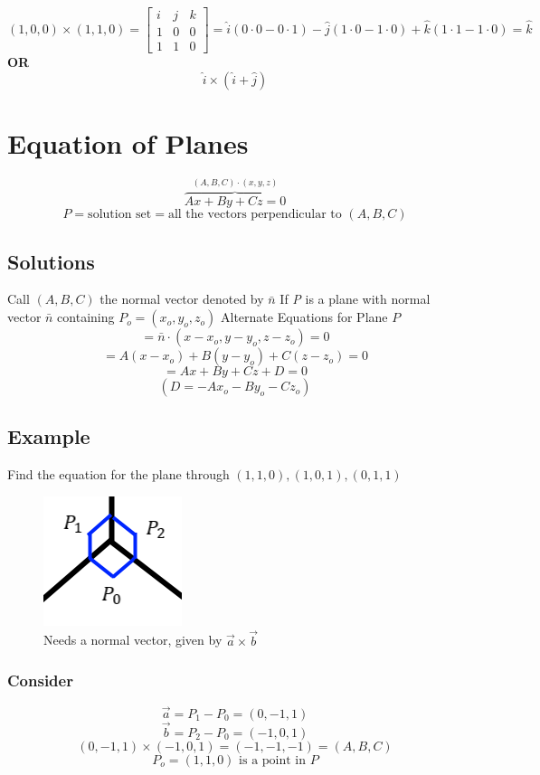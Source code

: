 \documentclass{article}
\begin{document}
\[(1,0,0)\times(1,1,0)=\begin{bmatrix}
    i&j&k\\
    1&0&0\\
    1&1&0
\end{bmatrix}=\hat{i}(0\cdot 0-0\cdot 1)-\hat{j}(1\cdot 0-1\cdot 0)+\hat{k}(1\cdot 1-1\cdot 0)=\hat{k}\]
\textbf{OR}
\[\hat{i}\times(\hat{i}+\hat{j})\]

\section{Equation of Planes}
\[\overbrace{Ax+By+Cz=0}^{(A,B,C)\cdot(x,y,z)}\]
\[P=\mbox{solution set}=\mbox{all the vectors perpendicular to }(A,B,C)\]

\subsection*{Solutions}
Call $(A,B,C)$ the normal vector denoted by $\bar{n}$
\newline
If \textit{P} is a plane with normal vector $\bar{n}$ containing $P_o=(x_o,y_o,z_o)$
\newline
Alternate Equations for Plane $P$
\[=\bar{n}\cdot(x-x_o,y-y_o,z-z_o)=0\]
\[=A(x-x_o)+B(y-y_o)+C(z-z_o)=0\]
\[=Ax+By+Cz+D=0\]
\[(D=-Ax_o-By_o-Cz_o)\]

\subsection*{Example}
Find the equation for the plane through $(1,1,0),(1,0,1),(0,1,1)$
\begin{figure}[h!]
    \centering
    \includegraphics[scale=0.5]{planeExample.png}
    \caption{Needs a normal vector, given by $\vec{a}\times\vec{b}$}
    \label{}
\end{figure}

\subsubsection*{Consider}
\[\vec{a}=P_{1}-P_{0}=(0,-1,1)\]
\[\vec{b}=P_{2}-P_{0}=(-1,0,1)\]
\[(0,-1,1)\times(-1,0,1)=(-1,-1,-1)=(A,B,C)\]
\[P_o=(1,1,0)\mbox{ is a point in }P\]
\end{document}
